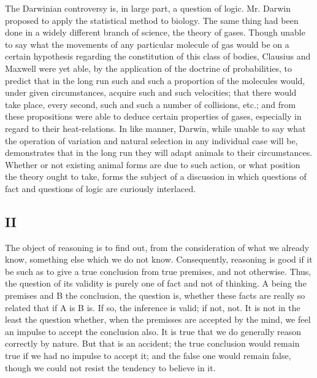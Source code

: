\documentclass[]{article}
\begin{document}
The Darwinian controversy is, in large part, a question of logic. Mr. Darwin proposed to apply the statistical method to biology. The same thing had been done in a widely different branch of science, the theory of gases. Though unable to say what the movements of any particular molecule of gas would be on a certain hypothesis regarding the constitution of this class of bodies, Clausius and Maxwell were yet able, by the application of the doctrine of probabilities, to predict that in the long run such and such a proportion of the molecules would, under given circumstances, acquire such and such velocities; that there would take place, every second, such and such a number of collisions, etc.; and from these propositions were able to deduce certain properties of gases, especially in regard to their heat-relations. In like manner, Darwin, while unable to say what the operation of variation and natural selection in any individual case will be, demonstrates that in the long run they will adapt animals to their circumstances. Whether or not existing animal forms are due to such action, or what position the theory ought to take, forms the subject of a discussion in which questions of fact and questions of logic are curiously interlaced.

\subsection*{II}

The object of reasoning is to find out, from the consideration of what we already know, something else which we do not know. Consequently, reasoning is good if it be such as to give a true conclusion from true premises, and not otherwise. Thus, the question of its validity is purely one of fact and not of thinking. A being the premises and B the conclusion, the question is, whether these facts are really so related that if A is B is. If so, the inference is valid; if not, not. It is not in the least the question whether, when the premisses are accepted by the mind, we feel an impulse to accept the conclusion also. It is true that we do generally reason correctly by nature. But that is an accident; the true conclusion would remain true if we had no impulse to accept it; and the false one would remain false, though we could not resist the tendency to believe in it.
\end{document}
